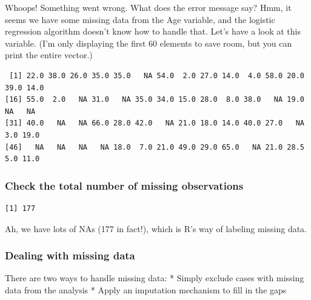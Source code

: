 \documentclass[
]{article}
\newenvironment{Shaded}{\begin{snugshade}}{\end{snugshade}}
\newcommand{\DecValTok}[1]{\textcolor[rgb]{0.00,0.00,0.81}{#1}}
\newcommand{\FunctionTok}[1]{\textcolor[rgb]{0.13,0.29,0.53}{\textbf{#1}}}
\newcommand{\NormalTok}[1]{#1}
\newcommand{\SpecialCharTok}[1]{\textcolor[rgb]{0.81,0.36,0.00}{\textbf{#1}}}
\begin{document}
Whoops! Something went wrong. What does the error message say? Hmm, it
seems we have some missing data from the Age variable, and the logistic
regression algorithm doesn't know how to handle that. Let's have a look
at this variable. (I'm only displaying the first 60 elements to save
room, but you can print the entire vector.)

\begin{Shaded}
\end{Shaded}

\begin{verbatim}
 [1] 22.0 38.0 26.0 35.0 35.0   NA 54.0  2.0 27.0 14.0  4.0 58.0 20.0 39.0 14.0
[16] 55.0  2.0   NA 31.0   NA 35.0 34.0 15.0 28.0  8.0 38.0   NA 19.0   NA   NA
[31] 40.0   NA   NA 66.0 28.0 42.0   NA 21.0 18.0 14.0 40.0 27.0   NA  3.0 19.0
[46]   NA   NA   NA   NA 18.0  7.0 21.0 49.0 29.0 65.0   NA 21.0 28.5  5.0 11.0
\end{verbatim}

\subsubsection{Check the total number of missing
observations}\label{check-the-total-number-of-missing-observations}

\begin{Shaded}
\end{Shaded}

\begin{verbatim}
[1] 177
\end{verbatim}

Ah, we have lots of NAs (177 in fact!), which is R's way of labeling
missing data.

\subsubsection{Dealing with missing
data}\label{dealing-with-missing-data}

There are two ways to handle missing data: * Simply exclude cases with
missing data from the analysis * Apply an imputation mechanism to fill
in the gaps
\end{document}
